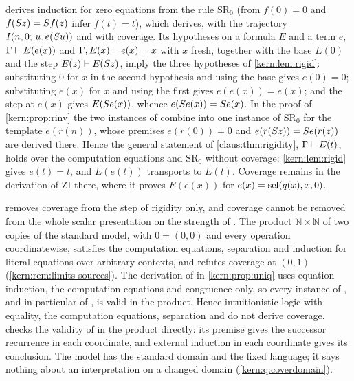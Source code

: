 \begin{remark}
\label{kern:rem:rinv-claus}
 derives induction for zero equations from the rule
$\mathrm{SR}_0$ (from $f(0)=0$ and $f(S z)=S f(z)$ infer $f(t)=t$),
which  derives, with the trajectory $I(n,0;\,u.\,e(S u))$
and with coverage.  Its hypotheses on a formula $E$ and a term $e$,
$\Gamma\vdash E(e(x))$ and $\Gamma,E(x)\vdash e(x)=x$ with $x$ fresh,
together with the base $E(0)$ and the step $E(z)\vdash E(S z)$, imply the
three hypotheses of \cref{kern:lem:rigid}: substituting $0$ for $x$ in the
second hypothesis and using the base gives $e(0)=0$; substituting $e(x)$ for
$x$ and using the first gives $e(e(x))=e(x)$; and the step at $e(x)$ gives
$E(S e(x))$, whence $e(S e(x))=S e(x)$.  In the proof of
\cref{kern:prop:rinv} the two instances of  combine into one
instance of $\mathrm{SR}_0$ for the template $e(r(n))$, whose premises
$e(r(0))=0$ and $e(r(S z))=S e(r(z))$ are derived there.  Hence the
general statement of \cref{claus:thm:rigidity}, $\Gamma\vdash E(t)$, holds
over the computation equations and $\mathrm{SR}_0$ without coverage:
\cref{kern:lem:rigid} gives $e(t)=t$, and $E(e(t))$ transports to $E(t)$.
Coverage remains in the derivation of $\mathrm{ZI}$ there, where it proves
$E(e(x))$ for $e(x)=\operatorname{sel}(q(x),x,0)$.
\end{remark}

\begin{remark}
\label{kern:rem:rinv-product}
 removes coverage from the step of rigidity only, and
coverage cannot be removed from the whole scalar presentation on the
strength of .  The product $\mathbb N\times\mathbb N$ of two
copies of the standard model, with $0=(0,0)$ and every operation
coordinatewise, satisfies the computation equations, separation and
induction for literal equations over arbitrary contexts, and refutes
coverage at $(0,1)$ (\cref{kern:rem:limits-sources}).  The derivation of
 in \cref{kern:prop:uniq} uses equation induction, the
computation equations and congruence only, so every instance of
, and in particular of , is valid in the product.
Hence intuitionistic logic with equality, the computation equations,
separation and  do not derive coverage.  
checks the validity of  in the product directly: its premise
gives the successor recurrence in each coordinate, and external induction in
each coordinate gives its conclusion.  The model has the standard domain
and the fixed language; it says nothing about an interpretation on a changed
domain (\cref{kern:q:coverdomain}).
\end{remark}

